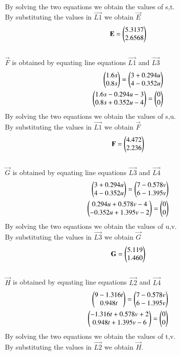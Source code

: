 \begin{enumerate}[label=\arabic*.,ref=\thesubsection.\theenumi]
\begin{align}
\end{align}
By solving the two equations we obtain the values of s,t.
\\
By substituting the values in $\vec{L1}$ we obtain $\vec{E}$
\\
$$\mathbf{E}=\begin{pmatrix}5.3137\\2.6568\end{pmatrix}$$
\\
$\vec{F}$ is obtained by equating line equations $\vec{L1}$ and $\vec{L3}$
\begin{align}
\begin{pmatrix}1.6s\\0.8s\end{pmatrix}=\begin{pmatrix}3+0.294u\\4-0.352u\end{pmatrix}
\\
\begin{pmatrix}1.6s-0.294u-3\\0.8s+0.352u-4\end{pmatrix}=\begin{pmatrix}0\\0\end{pmatrix}
\end{align}
By solving the two equations we obtain the values of s,u.
\\
By substituting the values in $\vec{L1}$ we obtain $\vec{F}$
\\
$$\mathbf{F}=\begin{pmatrix}4.472\\2.236\end{pmatrix}$$
\\
$\vec{G}$ is obtained by equating line equations $\vec{L3}$ and $\vec{L4}$
\begin{align}
\begin{pmatrix}3+0.294u\\4-0.352u\end{pmatrix}=\begin{pmatrix}7-0.578v\\6-1.395v\end{pmatrix}
\\
\begin{pmatrix}0.294u+0.578v-4\\-0.352u+1.395v-2\end{pmatrix}=\begin{pmatrix}0\\0\end{pmatrix}
\end{align}
By solving the two equations we obtain the values of u,v.
\\
By substituting the values in $\vec{L3}$ we obtain $\vec{G}$
\\
$$\mathbf{G}=\begin{pmatrix}5.119\\1.460\end{pmatrix}$$
\\
$\vec{H}$ is obtained by equating line equations $\vec{L2}$ and $\vec{L4}$
\begin{align}
\begin{pmatrix}9-1.316t\\0.948t\end{pmatrix}=\begin{pmatrix}7-0.578v\\6-1.395v\end{pmatrix}
\\
\begin{pmatrix}-1.316t+0.578v+2\\0.948t+1.395v-6\end{pmatrix}=\begin{pmatrix}0\\0\end{pmatrix}
\end{align}
By solving the two equations we obtain the values of t,v.
\\
By substituting the values in $\vec{L2}$ we obtain $\vec{H}$.

\end{enumerate}
